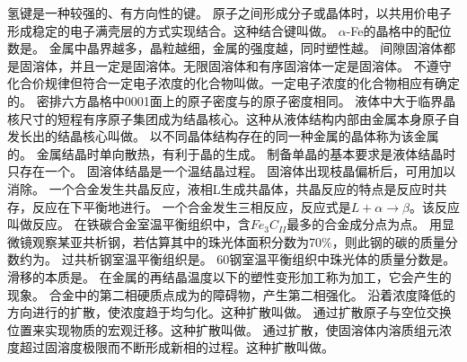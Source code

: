 \documentclass[12pt,answers]{exam}
\begin{document}
\begin{questions}
		\question 氢键是一种较强的、有方向性的\fillin[范德瓦耳斯]键。
		\question 原子之间形成分子或晶体时，以共用价电子形成稳定的电子满壳层的方式实现结合。这种结合键叫做\fillin[共价键]。
		\question $\alpha $-Fe的晶格中的配位数是\fillin[8]。
		\question 金属中晶界越多，晶粒越细，金属的强度越\fillin[高]，同时塑性越\fillin[好]。
		\question 间隙固溶体都是\fillin[有限]固溶体，并且一定是\fillin[无序]固溶体。无限固溶体和有序固溶体一定是\fillin[置换]固溶体。
		\question 不遵守化合价规律但符合一定电子浓度的化合物叫做\fillin[电子化合物]。一定电子浓度的化合物相应有确定的\fillin[晶体结构]。
		\question 密排六方晶格中{0001}面上的原子密度与的原子密度相同。
		\question 液体中大于临界晶核尺寸的短程有序原子集团成为结晶核心。这种从液体结构内部由金属本身原子自发长出的结晶核心叫做\fillin[自发形核]。
		\question 以不同晶体结构存在的同一种金属的晶体称为该金属的\fillin[同素异构晶体]。
		\question 金属结晶时单向散热，有利于\fillin[柱状]晶的生成。
		\question 制备单晶的基本要求是液体结晶时只存在一个\fillin[晶核]。
		\question 固溶体结晶是一个\fillin[变]温结晶过程。
		\question 固溶体出现枝晶偏析后，可用\fillin[扩散退火]加以消除。
		\question 一个合金发生共晶反应，液相L生成共晶体\fillin[$\alpha +\beta$]，共晶反应的特点是反应时\fillin[三相]共存，反应在\fillin[恒温]下平衡地进行。
		\question 一个合金发生三相反应，反应式是$L+\alpha \rightarrow \beta $。该反应叫做\fillin[包晶]反应。
		\question 在铁碳合金室温平衡组织中，含$Fe_3C_{II}$最多的合金成分点为\fillin[E]点。
		\question 用显微镜观察某亚共析钢，若估算其中的珠光体面积分数为70$\%$，则此钢的碳的质量分数约为\fillin[0.55$\%$]。
		\question 过共析钢室温平衡组织是\fillin[P+$Fe_3C_{II}$]。
		\question 60钢室温平衡组织中珠光体的质量分数是\fillin[77$\%$]。
		\question 滑移的本质是\fillin[晶体内部位错在切应力作用下的运动]。
		\question 在金属的再结晶温度以下的塑性变形加工称为\fillin[冷]加工，它会产生\fillin[加工硬化]的现象。
		\question 合金中的第二相硬质点成为\fillin[位错移动]的障碍物，产生第二相强化。
		\question 沿着浓度降低的方向进行的扩散，使浓度趋于均匀化。这种扩散叫做\fillin[下坡扩散]。
		\question 通过扩散原子与空位交换位置来实现物质的宏观迁移。这种扩散叫做\fillin[空位扩散]。
		\question 通过扩散，使固溶体内溶质组元浓度超过固溶度极限而不断形成新相的过程。这种扩散叫做\fillin[反应扩散]。
	\end{questions}
\end{document}
